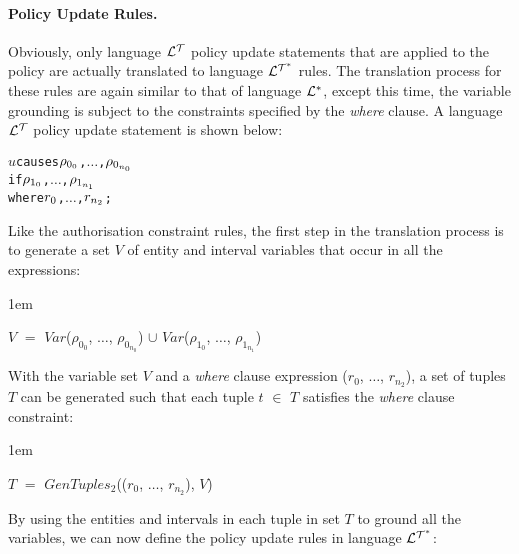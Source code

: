 \documentclass[11pt]{report}
\newenvironment{vverbatim}
{
  \begin{alltt}
}
{
    \vspace{-\baselineskip}
  \end{alltt}
}
\newenvironment{vquote}
{
  \begin{list}{}{\leftmargin 1em}\item[]
}
{
  \end{list}
}
\begin{document}
          \paragraph
            {\bf Policy Update Rules.}

            Obviously, only language ${\cal L^T}$ policy update statements
            that are applied to the policy are actually translated to
            language ${\cal L^{T^*}}$ rules. The translation process for
            these rules are again similar to that of language ${\cal L^*}$,
            except this time, the variable grounding is subject to the
            constraints specified by the {\em where} clause. A language
            ${\cal L^T}$ policy update statement is shown below:

            \begin{vverbatim}
  \(u\) causes \(\rho\sb{0\sb{0}}\), \(\ldots\), \(\rho\sb{0\sb{n\sb{0}}}\)
    if \(\rho\sb{1\sb{0}}\), \(\ldots\), \(\rho\sb{1\sb{n\sb{1}}}\)
    where \(r\sb{0}\), \(\ldots\), \(r\sb{n\sb{2}}\);
            \end{vverbatim}

            \noindent
            Like the authorisation constraint rules, the first step in the
            translation process is to generate a set $V$ of entity and
            interval variables that occur in all the expressions:

            \begin{vquote}
              $V$ $=$
              $Var$($\rho_{0_0}$, $\ldots$, $\rho_{0_{n_0}}$) $\cup$
              $Var$($\rho_{1_0}$, $\ldots$, $\rho_{1_{n_1}}$)
            \end{vquote}

            \noindent
            With the variable set $V$ and a {\em where} clause expression
            ($r_0$, $\ldots$, $r_{n_2}$), a set of tuples $T$ can be
            generated such that each tuple $t$ $\in$ $T$ satisfies the
            {\em where} clause constraint:

            \begin{vquote}
              $T$ $=$
              $GenTuples_2$(($r_0$, $\ldots$, $r_{n_2}$), $V$)
            \end{vquote}

            \noindent
            By using the entities and intervals in each tuple in set $T$
            to ground all the variables, we can now define the policy
            update rules in language ${\cal L^{T^*}}$:
\end{document}

